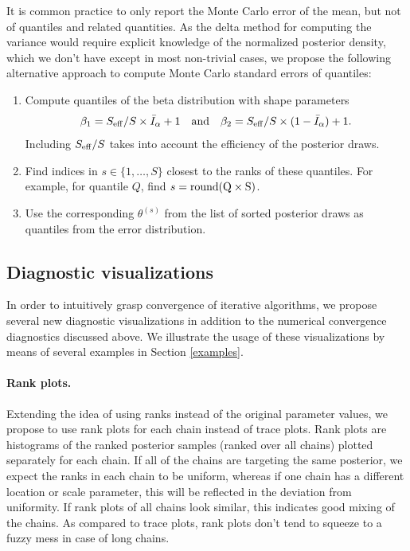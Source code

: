 \documentclass[american,]{article}
\let\oldparagraph\paragraph
\renewcommand{\paragraph}[1]{\oldparagraph{#1}\mbox{}}
\theoremstyle{definition}
\begin{document}
It is common practice to only report the Monte Carlo error of the mean,
but not of quantiles and related quantities. As the delta method for
computing the variance would require explicit knowledge of the
normalized posterior density, which we don't have except in most non-trivial
cases, we propose the following alternative approach to compute Monte
Carlo standard errors of quantiles:

\begin{enumerate}
\def\labelenumi{\arabic{enumi}.}
\item
  Compute quantiles of the beta distribution with shape parameters
  \begin{equation}
  \beta_1 = S_{\rm eff} / S \times \bar{I}_\alpha+1 \quad \text{and} \quad
  \beta_2 = S_{\rm eff} / S \times (1-\bar{I}_\alpha) + 1.
  \end{equation} Including \(S_{\rm eff}/S\) takes into account the
  efficiency of the posterior draws.
\item
  Find indices in \(s \in \{1,\ldots,S\}\) closest to the ranks of these
  quantiles. For example, for quantile \(Q\), find
  \(s = {\rm round(Q \times S)}\).
\item
  Use the corresponding \(\theta^{(s)}\) from the list of sorted
  posterior draws as quantiles from the error distribution. 
\end{enumerate}


\hypertarget{diagnostic-visualizations}{%
\subsection{Diagnostic visualizations}\label{diagnostic-visualizations}}

In order to intuitively grasp convergence of iterative algorithms, we
propose several new diagnostic visualizations in addition to the numerical
convergence diagnostics discussed above. We illustrate the usage of
these visualizations by means of several examples in Section
\ref{examples}.

\hypertarget{rank-plots}{%
\paragraph{Rank plots.}\label{rank-plots}}
Extending the idea of using ranks instead of the original parameter
values, we propose to use rank plots for each chain instead
of trace plots. Rank plots are histograms of the
ranked posterior samples (ranked over all chains) plotted separately for
each chain. If all of the chains are targeting the same posterior, we expect the 
ranks in each chain to be uniform, whereas if one chain has a different location
or scale parameter, this will be reflected in the deviation from uniformity. 
 If rank plots of all chains look similar, this indicates
good mixing of the chains. As compared to trace plots, rank plots don't
tend to squeeze to a fuzzy mess in case of long chains.
\end{document}

